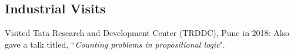 \documentclass[margin]{res}
\begin{document}
\begin{resume}

\section{Industrial Visits}
Visited Tata Research and Development Center (TRDDC), Pune in 2018: Also gave a talk titled, ``\emph{Counting problems in propositional logic}". 


\end{resume}
\end{document}

